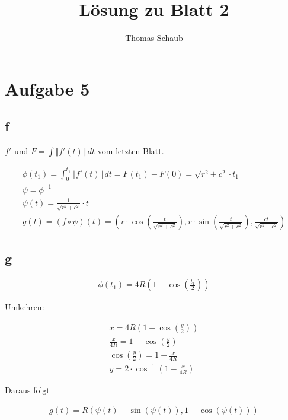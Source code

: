\documentclass{scrartcl}
\title{Lösung zu Blatt 2}
\author{Thomas Schaub}
\begin{document}
\maketitle

\section{Aufgabe 5}

\subsection{f}

$f\prime$ und $F = \int \Vert f\prime(t) \Vert \, dt$ vom letzten Blatt.

\begin{align*}
\phi(t_1) = \int_0^{t_1}  \Vert f\prime(t) \Vert \, dt = F(t_1) - F(0)
= \sqrt{r^2 + c^2} \cdot t_1 \\
\psi = \phi^{-1} \\
\psi(t) = \frac{1}{\sqrt{r^2 + c^2}} \cdot t \\
g(t) = (f \circ \psi)(t) = (
r \cdot \cos(\frac{t}{\sqrt{r^2 + c^2}}),
r \cdot \sin(\frac{t}{\sqrt{r^2 + c^2}}),
\frac{ct}{\sqrt{r^2 + c^2}}
)
\end{align*}

\subsection{g}

\begin{align*}
\phi(t_1) = 4R(1-\cos(\frac{t_1}{2}))
\end{align*}

Umkehren:

\begin{align*}
x = 4R(1-\cos(\frac{y}{2})) \\
\frac{x}{4R} = 1 - \cos(\frac{y}{2}) \\
\cos(\frac{y}{2}) = 1 - \frac{x}{4R} \\
y = 2 \cdot \cos^{-1} (1 - \frac{x}{4R})
\end{align*}

Daraus folgt

\begin{align*}
g(t) = R(\psi(t) - \sin(\psi(t)), 1 - \cos(\psi(t)))
\end{align*}
\end{document}
